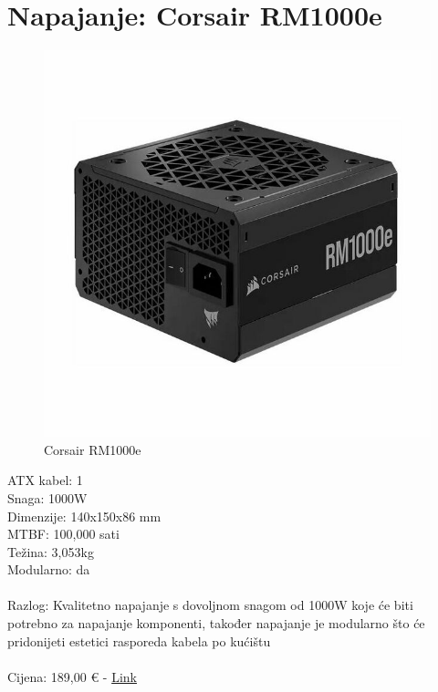 \documentclass{report}
\begin{document}
\section{Napajanje: Corsair RM1000e}
\begin{figure}[H]
    \centering
    \includegraphics[scale=0.3]{Slike/napajanje.jpeg}
    \caption{Corsair RM1000e}
    \label{fig:enter-napajanje}
\end{figure}
ATX kabel: 1\\Snaga: 1000W\\Dimenzije: 140x150x86 mm\\MTBF: 100,000 sati\\Težina: 3,053kg\\Modularno: da\\\\Razlog: Kvalitetno napajanje s dovoljnom snagom od 1000W koje će biti potrebno za napajanje komponenti, također napajanje je modularno što će pridonijeti estetici rasporeda kabela po kućištu\\\\Cijena: 189,00 € - \href{https://www.mikronis.hr/Proizvod/napajanje-corsair-rme-series-rm1000e-1000w-80-gold-fully-modular-atx-cp-9020264-eu/39577?utm\_source=nabava.net\&utm\_campaign=nabava.net\\\&utm\_medium=click}{Link}
\end{document}
